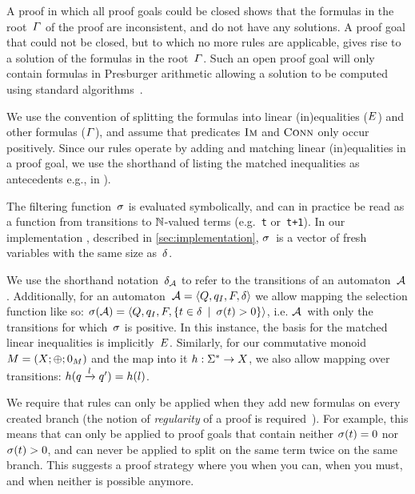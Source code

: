 A proof in which all proof goals could be closed shows that the formulas
in the root~$\varGamma$ of the proof are inconsistent, and do not
have any solutions. A proof goal that could not be closed, but to which no
more rules are applicable, gives rise to  a solution of the formulas in the
root~$\varGamma$. Such an open proof goal will only contain formulas
in Presburger arithmetic allowing a solution to be computed using
standard algorithms~\cite{Fitting96a}.

We use the convention of splitting the formulas into linear (in)equalities
($E$) and other formulas ($\varGamma$), and assume that
predicates $\operatorname{\textsc{Im}}$ and $\operatorname{\textsc{Conn}}$ only occur positively. Since our rules
operate by adding and matching linear (in)equalities in a proof goal, we use the
shorthand of listing the matched inequalities as antecedents e.g., in
\Propagate{}).

The filtering function~$\operatorname{\sigma}$ is evaluated symbolically, and can in practice
be read as a function from transitions to $\mathbb{N}$-valued terms
(e.g.~\texttt{t} or~\texttt{t+1}). In our implementation \Catra{}, described in
\cref{sec:implementation}, $\operatorname{\sigma}$~is a vector of fresh variables with the
same size as~$\delta$.

We use the shorthand notation~$\delta_{\mathcal{A}}$ to refer to the
transitions of an automaton~$\mathcal{A}$. Additionally, for an
automaton~$\mathcal{A} = \left\langle Q, q_I, F, \delta\right\rangle$ we allow mapping the selection function
like so: $\operatorname{\sigma}(\mathcal{A}) = \left\langle Q, q_I, F,
\left\{t \in \delta \:\mid\: \operatorname{\sigma}(t) > 0\right\}\right\rangle$, i.e.
$\mathcal{A}$~with only the transitions for which~$\operatorname{\sigma}$ is positive. In this
instance, the basis for the matched linear inequalities is
implicitly~$E$. Similarly, for our commutative monoid $M =
\left(X;\operatorname{\oplus};0_{M}\right)$ and the map into it $h : \Sigma^*
\rightarrow X$, we also allow mapping over transitions:
$h(q \xrightarrow{l} q') = h(l)$.

We require that rules can only be applied when they add new formulas
on every created branch (the notion of \emph{regularity} of a proof is
required~\cite{Fitting96a}). For example, this means that \Split{} can
only be applied to proof goals that contain neither
$\operatorname{\sigma}(t) = 0$ nor $\operatorname{\sigma}(t) > 0$, and can
never be applied to split on the same term twice on the same branch.
This suggests a proof strategy where you \Propagate{} when you can, \Split{}
when you must, and \Subsume{} when neither is possible anymore.

